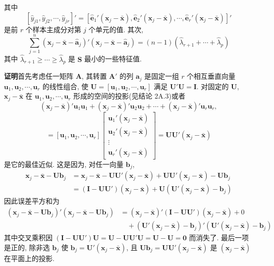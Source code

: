 
其中
\[
[\hat{y}_{j1},\hat{y}_{j2},\cdots,\hat{y}_{jr}]'=[\hat{\mathbf{e}}_1'(\mathbf{x}_j-\bar{\mathbf{x}}),\hat{\mathbf{e}}_2'(\mathbf{x}_j-\bar{\mathbf{x}}),\cdots,\hat{\mathbf{e}}_r'(\mathbf{x}_j-\bar{\mathbf{x}})]'
\]
是前 $r$ 个样本主成分对第 $j$ 个单元的值. 其次,
\[
\sum_{j=1}^{n}(\mathbf{x}_j-\bar{\mathbf{x}}-\hat{\mathbf{a}}_j)'(\mathbf{x}_j-\bar{\mathbf{x}}-\hat{\mathbf{a}}_j)=(n-1)(\hat{\lambda}_{r+1}+\cdots+\hat{\lambda}_p)
\]
其中 $\hat{\lambda}_{r+1}\geqslant\cdots\geqslant\hat{\lambda}_p$ 是 $\mathbf{S}$ 最小的一些特征值.

\noindent\textbf{证明}\quad 首先考虑任一矩阵 $\mathbf{A}$, 其转置 $\mathbf{A}'$ 的列 $\mathbf{a}_j$ 是固定一组 $r$ 个相互垂直向量 $\mathbf{u}_1,\mathbf{u}_2,\cdots,\mathbf{u}_r$ 的线性组合, 使 $\mathbf{U}=[\mathbf{u}_1,\mathbf{u}_2,\cdots,\mathbf{u}_r]$ 满足 $\mathbf{U}'\mathbf{U}=\mathbf{I}$. 对固定的 $\mathbf{U}$, $\mathbf{x}_j-\bar{\mathbf{x}}$ 在 $\mathbf{u}_1,\mathbf{u}_2,\cdots,\mathbf{u}_r$ 形成的空间的投影(见结论 2A.3)或者
\[
(\mathbf{x}_j-\bar{\mathbf{x}})'\mathbf{u}_1\mathbf{u}_1+(\mathbf{x}_j-\bar{\mathbf{x}})'\mathbf{u}_2\mathbf{u}_2+\cdots+(\mathbf{x}_j-\bar{\mathbf{x}})'\mathbf{u}_r\mathbf{u}_r,
\]
\label{eq:8A-2}
\begin{equation}
=[\mathbf{u}_1,\mathbf{u}_2,\cdots,\mathbf{u}_r]\begin{bmatrix}\mathbf{u}_1'(\mathbf{x}_j-\bar{\mathbf{x}})\\\mathbf{u}_2'(\mathbf{x}_j-\bar{\mathbf{x}})\\\vdots\\\mathbf{u}_r'(\mathbf{x}_j-\bar{\mathbf{x}})\end{bmatrix}=\mathbf{U}\mathbf{U}'(\mathbf{x}_j-\bar{\mathbf{x}}) \tag{8A-2}
\end{equation}
是它的最佳近似. 这是因为, 对任一向量 $\mathbf{b}_j$,
\[
\begin{aligned}
\mathbf{x}_j-\bar{\mathbf{x}}-\mathbf{U}\mathbf{b}_j&=\mathbf{x}_j-\bar{\mathbf{x}}-\mathbf{U}\mathbf{U}'(\mathbf{x}_j-\bar{\mathbf{x}})+\mathbf{U}\mathbf{U}'(\mathbf{x}_j-\bar{\mathbf{x}})-\mathbf{U}\mathbf{b}_j\\
&=(\mathbf{I}-\mathbf{U}\mathbf{U}')(\mathbf{x}_j-\bar{\mathbf{x}})+\mathbf{U}(\mathbf{U}'(\mathbf{x}_j-\bar{\mathbf{x}})-\mathbf{b}_j)
\end{aligned}
\]
因此误差平方和为
\[
\begin{aligned}
(\mathbf{x}_j-\bar{\mathbf{x}}-\mathbf{U}\mathbf{b}_j)'(\mathbf{x}_j-\bar{\mathbf{x}}-\mathbf{U}\mathbf{b}_j)&=(\mathbf{x}_j-\bar{\mathbf{x}})'(\mathbf{I}-\mathbf{U}\mathbf{U}')(\mathbf{x}_j-\bar{\mathbf{x}})+0\\
&\quad+(\mathbf{U}'(\mathbf{x}_j-\bar{\mathbf{x}})-\mathbf{b}_j)'(\mathbf{U}'(\mathbf{x}_j-\bar{\mathbf{x}})-\mathbf{b}_j)
\end{aligned}
\]
其中交叉乘积因 $(\mathbf{I}-\mathbf{U}\mathbf{U}')\mathbf{U}=\mathbf{U}-\mathbf{U}\mathbf{U}'\mathbf{U}=\mathbf{U}-\mathbf{U}=\mathbf{0}$ 而消失了. 最后一项是正的, 除非选 $\mathbf{b}_j$ 使 $\mathbf{b}_j=\mathbf{U}'(\mathbf{x}_j-\bar{\mathbf{x}})$, 且 $\mathbf{U}\mathbf{b}_j=\mathbf{U}\mathbf{U}'(\mathbf{x}_j-\bar{\mathbf{x}})$ 是 $(\mathbf{x}_j-\bar{\mathbf{x}})$ 在平面上的投影.

